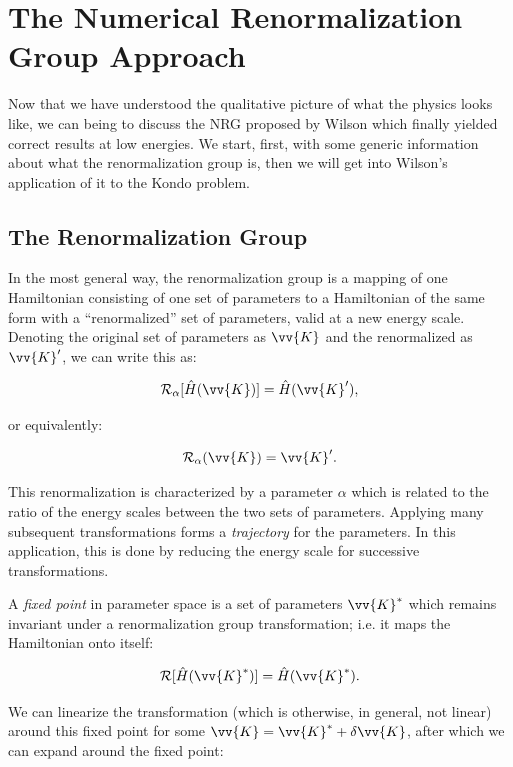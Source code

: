 \section{The Numerical Renormalization Group Approach}

Now that we have understood the qualitative picture of what the physics looks like, we can being to discuss the NRG proposed by Wilson which finally yielded correct results at low energies. We start, first, with some generic information about what the renormalization group is, then we will get into Wilson's application of it to the Kondo problem.

\subsection{The Renormalization Group}\label{sec:5-nrg-renormgroup}

In the most general way, the renormalization group is a mapping of one Hamiltonian consisting of one set of parameters to a Hamiltonian of the same form with a ``renormalized'' set of parameters, valid at a new energy scale. Denoting the original set of parameters as $\vv{K}$ and the renormalized as $\vv{K}'$, we can write this as:

\begin{equation}
  \mathcal{R}_\alpha[\hat{H}(\vv{K})] = \hat{H}(\vv{K}'),
\end{equation}

or equivalently:

\begin{equation}
  \mathcal{R}_\alpha(\vv{K}) = \vv{K}'.
\end{equation}

This renormalization is characterized by a parameter $\alpha$ which is related to the ratio of the energy scales between the two sets of parameters. Applying many subsequent transformations forms a \textit{trajectory} for the parameters. In this application, this is done by reducing the energy scale for successive transformations.

A \textit{fixed point} in parameter space is a set of parameters $\vv{K}^*$ which remains invariant under a renormalization group transformation; i.e. it maps the Hamiltonian onto itself:

\begin{equation}
  \mathcal{R}[\hat{H}(\vv{K}^*)] = \hat{H}(\vv{K}^*).
\end{equation}

We can linearize the transformation (which is otherwise, in general, not linear) around this fixed point for some $\vv{K} = \vv{K}^* + \delta\vv{K}$, after which we can expand around the fixed point:

